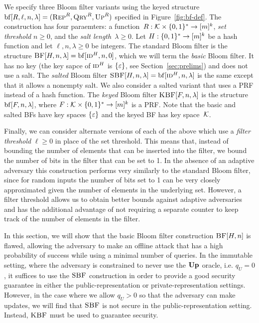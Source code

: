 \medskip
We specify three Bloom filter variants using the keyed structure
$\mathrm{bf}[R,\ell,n,\lambda] = (\textnormal{\textsc{Rep}}^R,\textnormal{\textsc{Qry}}^R,\textnormal{\textsc{Up}}^R)$ specified in
Figure~\ref{fig:bf-def}.
%
The construction has four paraemters: a function~$R:\mathcal{K}\times\{0,1\}^*\to[m]^k$,
\emph{set threshold} $n\geq0$, and the \emph{salt length}~$\lambda\geq0$.
%
Let $H:\{0,1\}^*\to[m]^k$ be a hash function and let $\ell, n, \lambda\geq0$ be
integers.
%
The standard Bloom filter is the structure $\textnormal{\textsc{BF}}[H,n,\lambda] =
\mathrm{bf}[\textnormal{\textsc{id}}^H,n,0]$, which we will term the \emph{basic} Bloom filter. It
has no key (the key sapce of $\textnormal{\textsc{id}}^H$ is $\{\varepsilon\}$, see
Section~\ref{sec:prelims}) and does not use a salt.
%
The \emph{salted} Bloom filter $\textnormal{\textsc{SBF}}[H,n,\lambda] =
\mathrm{bf}[\textnormal{\textsc{id}}^H,n,\lambda]$ is the same except that it allows a nonempty salt.
%
We also consider a salted variant that uses a PRF instead of a hash
function. The \emph{keyed} Bloom filter $\textnormal{\textsc{KBF}}[F,n,\lambda]$ is the
structure $\mathrm{bf}[F,n,\lambda]$, where $F:\mathcal{K}\times\{0,1\}^*\to[m]^k$ is a
PRF.
%
Note that the basic and salted BFs have key spaces $\{\varepsilon\}$ and the keyed
BF has key space~$\mathcal{K}$.

Finally, we can consider alternate versions of each of the above which use a
\emph{filter threshold} $\ell\geq0$ in place of the set threshold. This means
that, instead of bounding the number of elements that can be inserted into the
filter, we bound the number of bits in the filter that can be set to 1. In the
absence of an adaptive adversary this construction performs very similarly to
the standard Bloom filter, since for random inputs the number of bits set to 1
can be very closely approximated given the number of elements in the underlying
set. However, a filter threshold allows us to obtain better bounds against
adaptive adversaries and has the additional advantage of not requiring a
separate counter to keep track of the number of elements in the filter.

In this section, we will show that the basic Bloom filter construction
$\textnormal{\textsc{BF}}[H,n]$ is flawed, allowing the adversary to make an offline attack that
has a high probability of success while using a minimal number of queries. In
the immutable setting, where the adversary is constrained to never use the
$\textup{\textbf{Up}}\hspace{0.5pt}$ oracle, i.e. $q_U = 0$, it suffices to use the $\textnormal{\textsc{SBF}}$ construction in
order to provide a good security guarantee in either the public-representation
or private-representation settings. However, in the case where we allow
$q_U > 0$ so that the adversary can make updates, we will find that $\textnormal{\textsc{SBF}}$ is
not secure in the public-representation setting. Instead, $\textnormal{\textsc{KBF}}$ must be used to
guarantee security.

